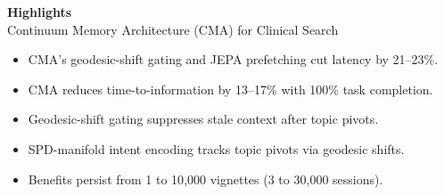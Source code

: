 \documentclass[12pt]{article}
\begin{document}
\begin{center}
  {\LARGE\bfseries Highlights}\\[1em]
  Continuum Memory Architecture (CMA) for Clinical Search\\
\end{center}

\vspace{1.5em}

\begin{itemize}
  \item CMA's geodesic-shift gating and JEPA prefetching cut latency by 21--23\%.
  \item CMA reduces time-to-information by 13--17\% with 100\% task completion.
  \item Geodesic-shift gating suppresses stale context after topic pivots.
  \item SPD-manifold intent encoding tracks topic pivots via geodesic shifts.
  \item Benefits persist from 1 to 10{,}000 vignettes (3 to 30{,}000 sessions).
\end{itemize}
\end{document}
